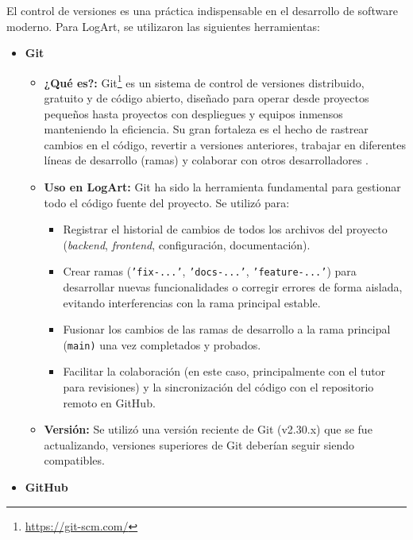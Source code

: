El control de versiones es una práctica indispensable en el desarrollo de software moderno. Para LogArt, se utilizaron las siguientes herramientas:
    \begin{itemize}
        \item \textbf{Git}
            \begin{itemize}
                \item \textbf{¿Qué es?:} Git\footnote{\url{https://git-scm.com/}} es un sistema de control de versiones distribuido, gratuito y de código abierto, diseñado para operar desde proyectos pequeños hasta proyectos con despliegues y equipos inmensos manteniendo la eficiencia. Su gran fortaleza es el hecho de rastrear cambios en el código, revertir a versiones anteriores, trabajar en diferentes líneas de desarrollo (ramas) y colaborar con otros desarrolladores \cite{gitlabDVCSBenefits}.
                \item \textbf{Uso en LogArt:} Git ha sido la herramienta fundamental para gestionar todo el código fuente del proyecto. Se utilizó para:
                    \begin{itemize}
                        \item Registrar el historial de cambios de todos los archivos del proyecto (\textit{backend}, \textit{frontend}, configuración, documentación).
                        \item Crear ramas (\texttt{'fix-...'}, \texttt{'docs-...'}, \texttt{'feature-...'}) para desarrollar nuevas funcionalidades o corregir errores de forma aislada, evitando interferencias con la rama principal estable.
                        \item Fusionar los cambios de las ramas de desarrollo a la rama principal (\texttt{main)} una vez completados y probados.
                        \item Facilitar la colaboración (en este caso, principalmente con el tutor para revisiones) y la sincronización del código con el repositorio remoto en GitHub.
                    \end{itemize}
                \item \textbf{Versión:} Se utilizó una versión reciente de Git (v2.30.x) que se fue actualizando, versiones superiores de Git deberían seguir siendo compatibles.
            \end{itemize}
        \vspace{0.3cm}
        \item \textbf{GitHub}
            \begin{itemize}

\end{itemize}
\end{itemize}
